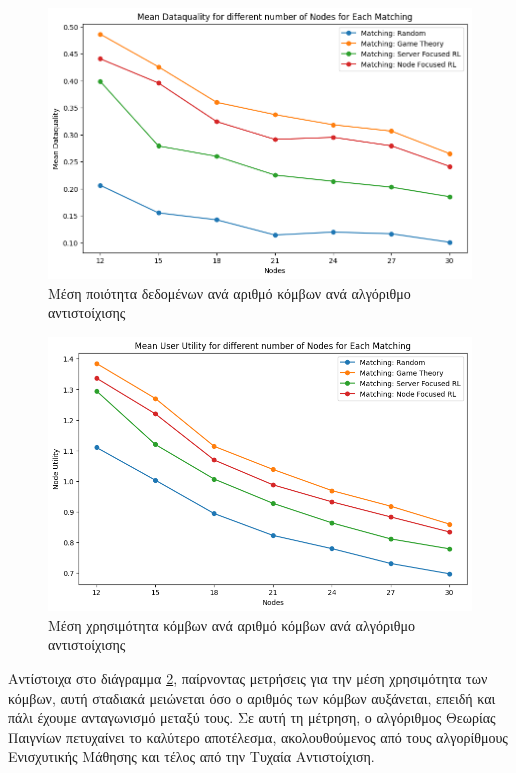 \begin{figure}[ht]
    \centering
    \includegraphics[width=\textwidth]{figures/chapter3/Mean_Dataquality_vs_Nodes.png}
    \caption{Μέση ποιότητα δεδομένων ανά αριθμό κόμβων ανά αλγόριθμο αντιστοίχισης}
    \label{fig52}
\end{figure}

\begin{figure}[H]
    \centering
    \includegraphics[width=\textwidth]{figures/chapter3/Mean_User_Utility_vs_Nodes.png}
    \caption{Μέση χρησιμότητα κόμβων ανά αριθμό κόμβων ανά αλγόριθμο αντιστοίχισης}
    \label{fig9}
\end{figure}

\newpage

Αντίστοιχα στο διάγραμμα \ref{fig9}, παίρνοντας μετρήσεις για την μέση χρησιμότητα των κόμβων, αυτή σταδιακά μειώνεται όσο ο αριθμός των κόμβων αυξάνεται, επειδή και πάλι έχουμε ανταγωνισμό μεταξύ τους. Σε αυτή τη μέτρηση, ο αλγόριθμος Θεωρίας Παιγνίων πετυχαίνει το καλύτερο αποτέλεσμα, ακολουθούμενος από τους αλγορίθμους Ενισχυτικής Μάθησης και τέλος από την Τυχαία Αντιστοίχιση.

